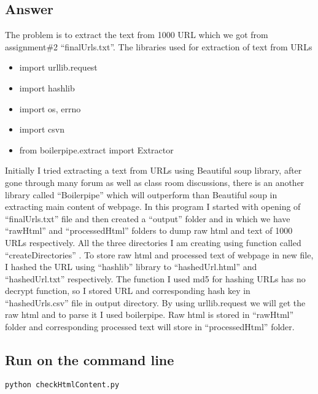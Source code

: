\documentclass[letterpaper,11pt]{article}
\begin{document}
\subsection*{Answer}

The problem is  to extract the text from 1000 URL which we got from assignment\#2 “finalUrls.txt”.
The libraries used for extraction of text from URLs
\begin{itemize}
    \item import urllib.request
    \item import hashlib
    \item import os, errno
    \item import csvn
  \item from boilerpipe.extract import Extractor
\end{itemize}

Initially I tried extracting a text from URLs  using  Beautiful soup library, after gone through many forum  as well as class  room discussions,  there is an another library called “Boilerpipe” which  will outperform than Beautiful soup in extracting  main content of webpage. In this program I started with opening of “finalUrls.txt” file and then created a  “output” folder and in which we have “rawHtml” and “processedHtml” folders to  dump raw html  and  text  of 1000 URLs  respectively.  All the three directories  I am creating using function called  “createDirectories” . To store raw html and processed text of webpage in new file,  I hashed the URL  using “hashlib” library to “hashedUrl.html” and “hashedUrl.txt” respectively. The  function I used md5 for hashing URLs has no decrypt function, so I stored URL and corresponding hash key in “hashedUrls.csv”  file in output directory. 
By using urllib.request we will get the raw html and to parse it I used boilerpipe. Raw html is stored in “rawHtml”  folder and corresponding processed text will store in “processedHtml” folder.
\subsection*{Run on the command line}
\begin{lstlisting}[frame=single]
python checkHtmlContent.py
\end{lstlisting}

\end{document}
